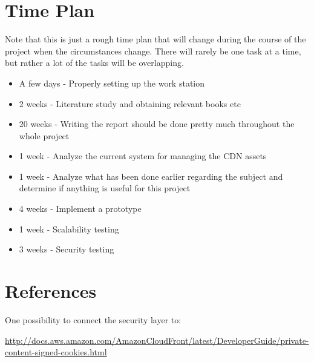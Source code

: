 \documentclass[a4paper,12pt]{article}
\begin{document}
\section{Time Plan}
Note that this is just a rough time plan that will change during the course of 
the project when the circumstances change.
There will rarely be one task at a time, but rather a lot of the tasks will be 
overlapping.
\begin{itemize}
  \item A few days - Properly setting up the work station
  \item 2 weeks - Literature study and obtaining relevant books etc
  \item 20 weeks - Writing the report should be done pretty much 
  throughout the whole project
  \item 1 week - Analyze the current system for managing the CDN assets
  \item 1 week - Analyze what has been done earlier regarding the 
  subject and determine if anything is useful for this project
  \item 4 weeks - Implement a prototype
  \item 1 week - Scalability testing
  \item 3 weeks - Security testing
\end{itemize}

\section{References}
    One possibility to connect the security layer to:

\url{http://docs.aws.amazon.com/AmazonCloudFront/latest/DeveloperGuide/private-content-signed-cookies.html}
\end{document}
